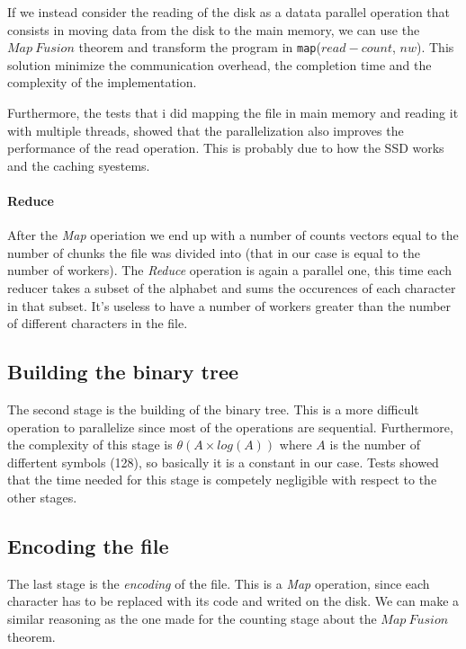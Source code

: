 \documentclass[12pt, letterpaper]{article}
\begin{document}
If we instead consider the reading of the disk as a datata parallel operation that consists in moving data from the disk to the main memory, we can use the $Map\ Fusion$ theorem and transform the program in \texttt{map}($read-count$, $nw$). This solution minimize the communication overhead, the completion time and the complexity of the implementation.


Furthermore, the tests that i did mapping the file in main memory and reading it with multiple threads, showed that the parallelization
also improves the performance of the read operation. This is probably due to how the SSD works and the caching syestems. 

\paragraph*{Reduce}
After the \textit{Map} operiation we end up with a number of counts vectors equal to the number of chunks the file was divided into (that in our case is equal to the number of workers). The \textit{Reduce} operation is again a parallel one, this time each reducer takes a subset of the alphabet and sums the occurences of each character in that subset. It's useless to have a number of workers greater than the number of different characters in the file.

\subsection{Building the binary tree}
The second stage is the building of the binary tree. This is a more difficult operation to parallelize since 
most of the operations are sequential. Furthermore, the complexity of this stage is $\theta(A \times log (A))$  where 
$A$ is the number of differtent symbols (128), so basically it is a constant in our case. Tests showed that the time needed for this stage is competely negligible with respect to the other stages.

\subsection{Encoding the file}
The last stage is the \textit{encoding} of the file. This is a \textit{Map} operation, since each character has to be replaced with its code and writed on the disk. We can make a similar reasoning as the one made for the counting stage about the $Map\ Fusion$ theorem.
\end{document}
